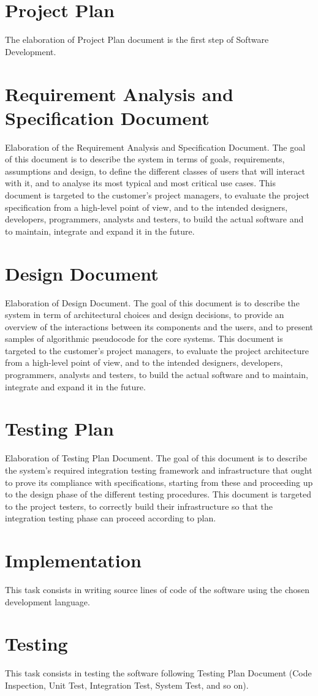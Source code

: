 \section{Project Plan}
The elaboration of Project Plan document is the first step of Software Development.

\section{Requirement Analysis and Specification Document}
Elaboration of the Requirement Analysis and Specification Document. The goal of this document is to describe the system in terms of goals, requirements, assumptions and design, to define the different classes of users that will interact with it, and to analyse its most typical and most critical use cases. 
This document is targeted to the customer's project managers, to evaluate the project specification from a high-level point of view, and to the intended designers, developers, programmers, analysts and testers, to build the actual software and to maintain, integrate and expand it in the future. 

\section{Design Document}
Elaboration of Design Document. The goal of this document is to describe the system in term of architectural choices and design decisions, to provide an overview of the interactions between its components and the users, and to present samples of algorithmic pseudocode for the core systems. This document is targeted to the customer's project managers, to evaluate the project architecture from a high-level point of view, and to the intended designers, developers, programmers, analysts and testers, to build the actual software and to maintain, integrate and expand it in the future. 

\section{Testing Plan}
Elaboration of Testing Plan Document. The goal of this document is to describe the system's required integration testing framework and infrastructure that ought to prove its compliance with specifications, starting from these and proceeding up to the design phase of the different testing procedures. This document is targeted to the project testers, to correctly build their infrastructure so that the integration testing phase can proceed according to plan. 

\section{Implementation}
This task consists in writing source lines of code of the software using the chosen development language.

\section{Testing}
This task consists in testing the software following Testing Plan Document (Code Inspection, Unit Test, Integration Test, System Test, and so on).
